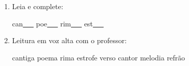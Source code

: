 \begin{exercicio}
\begin{enumerate}[resume]
\begin{enumerate}[label=(\alph*)]
    \item O som da unidade é: ( ) oral ( ) nasal 

    \item A primeira sílaba de CANTIGA é: ( ) CAN ( ) RIMA

    \item As palavras da unidade aparecem: ( ) no início ( ) no meio ( ) no fim das palavras

  \end{enumerate}

  \item Leia e complete:
  \begin{center}
  can\underline{~~~} \quad poe\underline{~~~} \quad rim\underline{~~~} \quad est\underline{~~~}
  \end{center}

  \item Leitura em voz alta com o professor:
  \begin{center}
  cantiga \quad poema \quad rima \quad estrofe \quad verso \quad cantor \quad melodia \quad refrão
  \end{center}

\end{enumerate}

\end{exercicio}



